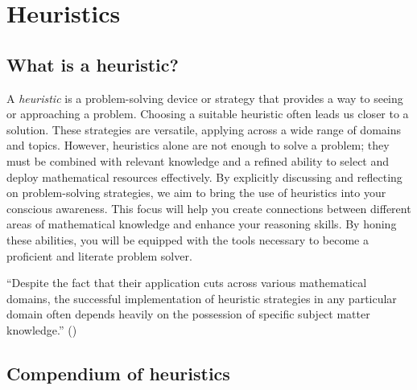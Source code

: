 \documentclass[
  a4paper,
  DIV=11,
  numbers=noendperiod,
  oneside]{scrreprt}
\begin{document}
\chapter{Heuristics}\label{sec-heuristics}

\section{What is a heuristic?}\label{what-is-a-heuristic}

A \emph{heuristic} is a problem-solving device or strategy that provides
a way to seeing or approaching a problem. Choosing a suitable heuristic
often leads us closer to a solution. These strategies are versatile,
applying across a wide range of domains and topics. However, heuristics
alone are not enough to solve a problem; they must be combined with
relevant knowledge and a refined ability to select and deploy
mathematical resources effectively. By explicitly discussing and
reflecting on problem-solving strategies, we aim to bring the use of
heuristics into your conscious awareness. This focus will help you
create connections between different areas of mathematical knowledge and
enhance your reasoning skills. By honing these abilities, you will be
equipped with the tools necessary to become a proficient and literate
problem solver.

\begin{tcolorbox}[enhanced jigsaw, bottomrule=.15mm, opacitybacktitle=0.6, left=2mm, colframe=quarto-callout-warning-color-frame, title=\textcolor{quarto-callout-warning-color}{\faExclamationTriangle}\hspace{0.5em}{Heuristics will not replace shaky mastery of a subject!}, opacityback=0, bottomtitle=1mm, coltitle=black, colbacktitle=quarto-callout-warning-color!10!white, breakable, toprule=.15mm, rightrule=.15mm, titlerule=0mm, arc=.35mm, colback=white, toptitle=1mm, leftrule=.75mm]

``Despite the fact that their application cuts across various
mathematical domains, the successful implementation of heuristic
strategies in any particular domain often depends heavily on the
possession of specific subject matter knowledge.''
()

\end{tcolorbox}

\section{Compendium of heuristics}\label{compendium-of-heuristics}
\end{document}
